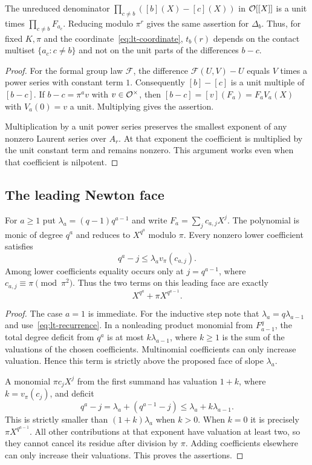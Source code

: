 \begin{lemma}\label{lem:associate}
The unreduced denominator $\prod_{c\ne b}([b](X)-[c](X))$ in $\mathcal O[[X]]$ is a unit times $\prod_{c\ne b}F_{a_c}$. Reducing modulo $\pi^r$ gives the same assertion for $\Delta_b$. Thus, for fixed $K,\pi$ and the coordinate~\eqref{eq:lt-coordinate}, $t_b(r)$ depends on the contact multiset $\{a_c:c\ne b\}$ and not on the unit parts of the differences $b-c$.
\end{lemma}
\begin{proof}
For the formal group law $\mathcal F$, the difference $\mathcal F(U,V)-U$ equals $V$ times a power series with constant term $1$. Consequently $[b]-[c]$ is a unit multiple of $[b-c]$. If $b-c=\pi^a v$ with $v\in\mathcal O^\times$, then
$[b-c]=[v](F_a)=F_a V_a(X)$ with $V_a(0)=v$ a unit. Multiplying gives the assertion.

Multiplication by a unit power series preserves the smallest exponent of any nonzero Laurent series over $A_r$. At that exponent the coefficient is multiplied by the unit constant term and remains nonzero. This argument works even when that coefficient is nilpotent.
\end{proof}

\subsection{The leading Newton face}

\begin{lemma}\label{lem:newton-face}
For $a\ge1$ put $\lambda_a=(q-1)q^{a-1}$ and write
$F_a=\sum_jc_{a,j}X^j$. The polynomial is monic of degree $q^a$ and reduces to $X^{q^a}$ modulo $\pi$. Every nonzero lower coefficient satisfies
\[
 q^a-j\le\lambda_a v_\pi(c_{a,j}).
\]
Among lower coefficients equality occurs only at $j=q^{a-1}$, where
$c_{a,j}\equiv\pi\pmod{\pi^2}$. Thus the two terms on this leading face are exactly
\[
 X^{q^a}+\pi X^{q^{a-1}}.
\]
\end{lemma}

\begin{proof}
The case $a=1$ is immediate. For the inductive step note that
$\lambda_a=q\lambda_{a-1}$ and use~\eqref{eq:lt-recurrence}. In a nonleading product monomial from $F_{a-1}^{q}$, the total degree deficit from $q^a$ is at most $k\lambda_{a-1}$, where $k\ge1$ is the sum of the valuations of the chosen coefficients. Multinomial coefficients can only increase valuation. Hence this term is strictly above the proposed face of slope $\lambda_a$.

A monomial $\pi c_jX^j$ from the first summand has valuation $1+k$, where $k=v_\pi(c_j)$, and deficit
\[
 q^a-j=\lambda_a+(q^{a-1}-j)
 \le\lambda_a+k\lambda_{a-1}.
\]
This is strictly smaller than $(1+k)\lambda_a$ when $k>0$. When $k=0$ it is precisely $\pi X^{q^{a-1}}$. All other contributions at that exponent have valuation at least two, so they cannot cancel its residue after division by $\pi$. Adding coefficients elsewhere can only increase their valuations. This proves the assertions.
\end{proof}

